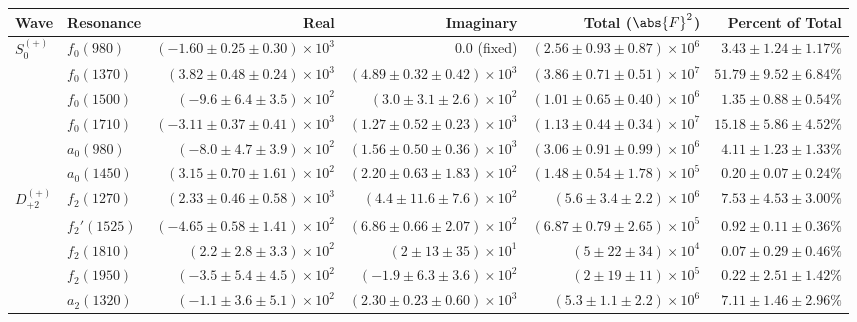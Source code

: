 \begin{table}[ht]
    \begin{center}
        \begin{tabular}{llrrrr}\toprule
        Wave & Resonance & Real & Imaginary & Total ($\abs{F}^2$) & Percent of Total \\\midrule
$S_{0}^{(+)}$ & $f_{0}(980)$ & $(-1.60 \pm 0.25 \pm 0.30) \times 10^{3}$ & $0.0$ (fixed) & $(2.56 \pm 0.93 \pm 0.87) \times 10^{6}$ & $3.43 \pm 1.24 \pm 1.17 \%$ \\
 & $f_{0}(1370)$ & $(3.82 \pm 0.48 \pm 0.24) \times 10^{3}$ & $(4.89 \pm 0.32 \pm 0.42) \times 10^{3}$ & $(3.86 \pm 0.71 \pm 0.51) \times 10^{7}$ & $51.79 \pm 9.52 \pm 6.84 \%$ \\
 & $f_{0}(1500)$ & $(-9.6 \pm 6.4 \pm 3.5) \times 10^{2}$ & $(3.0 \pm 3.1 \pm 2.6) \times 10^{2}$ & $(1.01 \pm 0.65 \pm 0.40) \times 10^{6}$ & $1.35 \pm 0.88 \pm 0.54 \%$ \\
 & $f_{0}(1710)$ & $(-3.11 \pm 0.37 \pm 0.41) \times 10^{3}$ & $(1.27 \pm 0.52 \pm 0.23) \times 10^{3}$ & $(1.13 \pm 0.44 \pm 0.34) \times 10^{7}$ & $15.18 \pm 5.86 \pm 4.52 \%$ \\
 & $a_{0}(980)$ & $(-8.0 \pm 4.7 \pm 3.9) \times 10^{2}$ & $(1.56 \pm 0.50 \pm 0.36) \times 10^{3}$ & $(3.06 \pm 0.91 \pm 0.99) \times 10^{6}$ & $4.11 \pm 1.23 \pm 1.33 \%$ \\
 & $a_{0}(1450)$ & $(3.15 \pm 0.70 \pm 1.61) \times 10^{2}$ & $(2.20 \pm 0.63 \pm 1.83) \times 10^{2}$ & $(1.48 \pm 0.54 \pm 1.78) \times 10^{5}$ & $0.20 \pm 0.07 \pm 0.24 \%$ \\
$D_{+2}^{(+)}$ & $f_{2}(1270)$ & $(2.33 \pm 0.46 \pm 0.58) \times 10^{3}$ & $(4.4 \pm 11.6 \pm 7.6) \times 10^{2}$ & $(5.6 \pm 3.4 \pm 2.2) \times 10^{6}$ & $7.53 \pm 4.53 \pm 3.00 \%$ \\
 & $f_{2}'(1525)$ & $(-4.65 \pm 0.58 \pm 1.41) \times 10^{2}$ & $(6.86 \pm 0.66 \pm 2.07) \times 10^{2}$ & $(6.87 \pm 0.79 \pm 2.65) \times 10^{5}$ & $0.92 \pm 0.11 \pm 0.36 \%$ \\
 & $f_{2}(1810)$ & $(2.2 \pm 2.8 \pm 3.3) \times 10^{2}$ & $(2 \pm 13 \pm 35) \times 10^{1}$ & $(5 \pm 22 \pm 34) \times 10^{4}$ & $0.07 \pm 0.29 \pm 0.46 \%$ \\
 & $f_{2}(1950)$ & $(-3.5 \pm 5.4 \pm 4.5) \times 10^{2}$ & $(-1.9 \pm 6.3 \pm 3.6) \times 10^{2}$ & $(2 \pm 19 \pm 11) \times 10^{5}$ & $0.22 \pm 2.51 \pm 1.42 \%$ \\
 & $a_{2}(1320)$ & $(-1.1 \pm 3.6 \pm 5.1) \times 10^{2}$ & $(2.30 \pm 0.23 \pm 0.60) \times 10^{3}$ & $(5.3 \pm 1.1 \pm 2.2) \times 10^{6}$ & $7.11 \pm 1.46 \pm 2.96 \%$ \\

\end{tabular}
\end{center}
\end{table}
